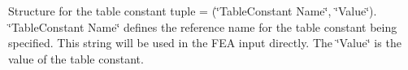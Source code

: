 Structure for the table constant tuple = (\char`\"{}\+Table\+Constant Name\char`\"{}, \char`\"{}\+Value\char`\"{}). \char`\"{}\+Table\+Constant Name\char`\"{} defines the reference name for the table constant being specified. This string will be used in the FEA input directly. The \char`\"{}\+Value\char`\"{} is the value of the table constant. 